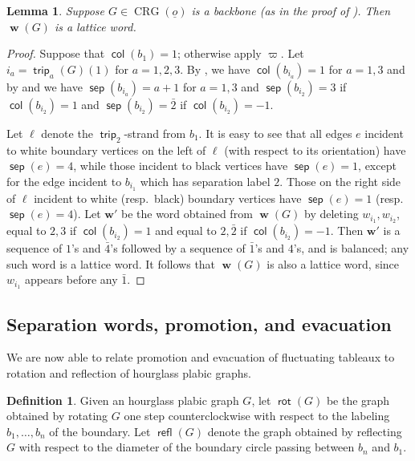 \documentclass{amsart}
\newtheorem{lemma}[theorem]{Lemma}
\theoremstyle{definition}
\newtheorem{definition}[theorem]{Definition}
\theoremstyle{remark}
\numberwithin{equation}{section}
\DeclareMathOperator{\trip}{\mathsf{trip}}
\DeclareMathOperator{\col}{\mathsf{col}}
\DeclareMathOperator{\bw}{\mathbf{w}}
\DeclareMathOperator{\sep}{\mathsf{sep}}
\DeclareMathOperator{\rot}{\mathsf{rot}}
\DeclareMathOperator{\refl}{\mathsf{refl}}
\DeclareMathOperator{\crg}{CRG}
\begin{document}
\begin{lemma}
\label{lem:backbone-is-lattice-word}
Suppose $G \in \crg(\underline{o})$ is a backbone (as in the proof of ). Then $\bw(G)$ is a lattice word.
\end{lemma}
\begin{proof}
Suppose that $\col(b_1)=1$; otherwise apply $\varpi$. Let $i_a = \trip_a(G)(1)$ for $a=1,2,3$. By , we have $\col(b_{i_a})=1$ for $a=1,3$ and by  and  we have $\sep(b_{i_a})=a+1$ for $a=1,3$ and $\sep(b_{i_2})=3$ if $\col(b_{i_2})=1$ and $\sep(b_{i_2})=\bar{2}$ if $\col(b_{i_2})=-1$. 

Let $\ell$ denote the $\trip_2$-strand from $b_1$. It is easy to see that all edges $e$ incident to white boundary vertices on the left of $\ell$ (with respect to its orientation) have $\sep(e)=4$, while those incident to black vertices have $\sep(e)=1$, except for the edge incident to $b_{i_1}$ which has separation label $2$. Those on the right side of $\ell$ incident to white (resp.\ black) boundary vertices have $\sep(e)=1$ (resp.\ $\sep(e)=4$). Let $\mathbf{w}'$ be the word obtained from $\bw(G)$ by deleting $w_{i_1},w_{i_2}$, equal to $2,3$ if $\col(b_{i_2})=1$ and equal to $2,\bar{2}$ if $\col(b_{i_2})=-1$. Then $\mathbf{w}'$ is a sequence of $1$'s and $\bar{4}$'s followed by a sequence of $\bar{1}$'s and $4$'s, and is balanced; any such word is a lattice word. It follows that $\bw(G)$ is also a lattice word, since $w_{i_1}$ appears before any $\bar{1}$.
\end{proof}



\subsection{Separation words, promotion, and evacuation} We are now able to relate promotion and evacuation of fluctuating tableaux to rotation and reflection of hourglass plabic graphs.

\begin{definition}
\label{def:rot-and-refl}
Given an hourglass plabic graph $G$, let $\rot(G)$ be the graph obtained by rotating $G$ one step counterclockwise with respect to the labeling $b_1,\ldots,b_n$ of the boundary. Let $\refl(G)$ denote the graph obtained by reflecting $G$ with respect to the diameter of the boundary circle passing between $b_n$ and $b_1$.
\end{definition}
\end{document}
